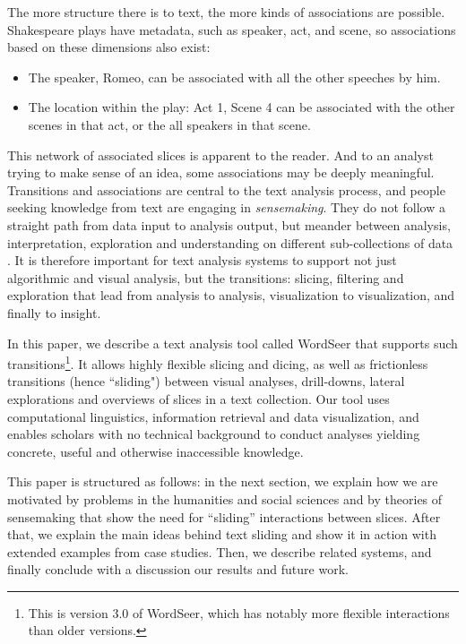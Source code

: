 \documentclass{sig-alternate}
\begin{document}
The more structure there is to text, the more kinds of associations are possible. Shakespeare plays have metadata, such as speaker, act, and scene, so associations based on these dimensions also exist:
\begin{itemize}
\item The speaker, Romeo, can be associated with all the other speeches by him.
\item The location within the play: Act 1, Scene 4 can be associated with the other scenes in that act, or the all speakers in that scene.
\end{itemize}

This network of associated slices is apparent to the reader. And to an analyst trying to make sense of an idea, some associations may be deeply meaningful.  Transitions  and associations are central to the text analysis process, and people seeking knowledge from text are engaging in \emph{sensemaking}. They do not follow a straight path from data input to analysis output, but meander between analysis, interpretation, exploration and understanding on different sub-collections of data \cite{russell_cost_1993, pirolli_sensemaking_2005}.  It is therefore important for text analysis systems to support not just algorithmic and visual analysis, but the transitions: slicing, filtering and exploration that lead from analysis to analysis, visualization to visualization, and finally to insight.

In this paper, we describe a text analysis tool called WordSeer that supports such transitions\footnote{This is version 3.0 of WordSeer, which has notably more flexible interactions than older versions.}.  It allows highly flexible slicing and dicing, as well as frictionless transitions (hence ``sliding") between visual analyses, drill-downs, lateral explorations and overviews of slices in a text collection. Our tool uses computational linguistics, information retrieval and data visualization, and enables scholars with no technical background to conduct analyses yielding concrete, useful and otherwise inaccessible knowledge. 

This paper is structured as follows: in the next section, we explain how we are motivated  by problems in the  humanities and social sciences and by theories of sensemaking that show the need for ``sliding'' interactions between slices. After that, we explain the main ideas behind text sliding and show it in action with extended examples from case studies. Then, we describe related systems, and finally conclude with a discussion our results and future work.
\end{document}
